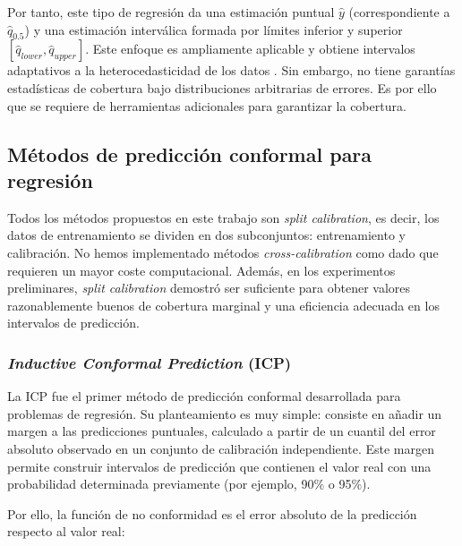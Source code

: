 Por tanto, este tipo de regresión da una estimación puntual $\hat{y}$ (correspondiente a $\hat{q}_{0.5}$) y una estimación interválica formada por límites inferior y superior $\left[ \hat{q}_{lower}, \hat{q}_{upper} \right]$. Este enfoque es ampliamente aplicable y obtiene intervalos adaptativos a la heterocedasticidad de los datos \cite{romano2019}. Sin embargo, no tiene garantías estadísticas de cobertura bajo distribuciones arbitrarias de errores. Es por ello que se requiere de herramientas adicionales para garantizar la cobertura.


\subsection{Métodos de predicción conformal para regresión}

Todos los métodos propuestos en este trabajo son \textit{split calibration}, es decir, los datos de entrenamiento se dividen en dos subconjuntos: entrenamiento y calibración. No hemos implementado métodos \textit{cross-calibration} como \cite{barber2021} dado que requieren un mayor coste computacional. Además, en los experimentos preliminares, \textit{split calibration} demostró ser suficiente para obtener valores razonablemente buenos de cobertura marginal y una eficiencia adecuada en los intervalos de predicción.


\subsubsection{\textit{Inductive Conformal Prediction} (ICP)}

La \acrshort{ICP} \cite{papadopoulos2002} fue el primer método de predicción conformal desarrollada para problemas de regresión. Su planteamiento es muy simple: consiste en añadir un margen a las predicciones puntuales, calculado a partir de un cuantil del error absoluto observado en un conjunto de calibración independiente. Este margen permite construir intervalos de predicción que contienen el valor real con una probabilidad determinada previamente (por ejemplo, 90\% o 95\%). 

Por ello, la función de no conformidad es el error absoluto de la predicción respecto al valor real:

